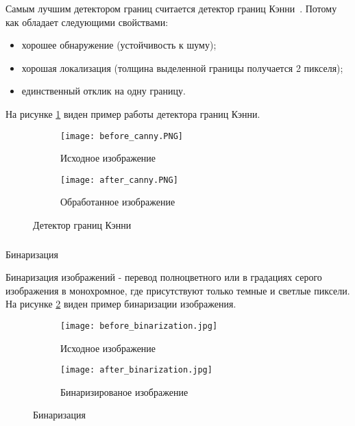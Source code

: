 Самым лучшим детектором границ считается детектор границ Кэнни~\cite{canny_edge_detector}. Потому как обладает следующими свойствами:
\begin{itemize}
  \item хорошее обнаружение (устойчивость к шуму);
  \item хорошая локализация (толщина выделенной границы получается 2 пикселя);
  \item единственный отклик на одну границу.
\end{itemize}

На рисунке \ref{fig:domain:image_processing:edges_detection:canny} виден пример работы детектора границ Кэнни. 

\begin{figure}[ht]
\centering
  \begin{subfigure}[b]{0.48\textwidth} 
    \centering
    \texttt{[image: before\_canny.PNG]}  
    \caption{Исходное изображение}
  \end{subfigure}
  \begin{subfigure}[b]{0.48\textwidth} 
    \centering
    \texttt{[image: after\_canny.PNG]}  
    \caption{Обработанное изображение}
  \end{subfigure}
  \caption{Детектор границ Кэнни}
  \label{fig:domain:image_processing:edges_detection:canny}
\end{figure}


\subsubsection{}
\label{sub:temp:image_processing:binary}
Бинаризация

Бинаризация изображений - перевод полноцветного или в градациях серого изображения в монохромное, где присутствуют только темные и светлые пиксели\cite{binary_image}. На рисунке \ref{fig:domain:image_processing:binary:binarization} виден пример бинаризации изображения.

\begin{figure}[ht]
\centering
  \begin{subfigure}[b]{0.48\textwidth} 
    \centering
    \texttt{[image: before\_binarization.jpg]}  
    \caption{Исходное изображение}
  \end{subfigure}
  \begin{subfigure}[b]{0.48\textwidth} 
    \centering
    \texttt{[image: after\_binarization.jpg]}  
    \caption{Бинаризированое изображение}
  \end{subfigure}
  \caption{Бинаризация}
  \label{fig:domain:image_processing:binary:binarization}
\end{figure}


